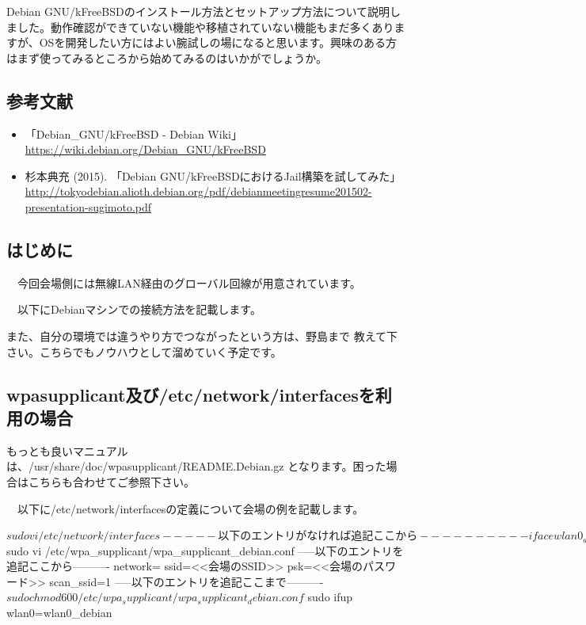 \documentclass[mingoth,a4paper]{jsarticle}
\begin{document}
Debian GNU/kFreeBSDのインストール方法とセットアップ方法について説明しました。動作確認ができていない機能や移植されていない機能もまだ多くありますが、OSを開発したい方にはよい腕試しの場になると思います。興味のある方はまず使ってみるところから始めてみるのはいかがでしょうか。

\subsection{参考文献}

\begin{itemize}
  \item 「Debian\_GNU/kFreeBSD - Debian Wiki」 \url{https://wiki.debian.org/Debian\_GNU/kFreeBSD}
  \item 杉本典充 (2015). 「Debian GNU/kFreeBSDにおけるJail構築を試してみた」 \url{http://tokyodebian.alioth.debian.org/pdf/debianmeetingresume201502-presentation-sugimoto.pdf}
\end{itemize}

 \subsection{はじめに}

　今回会場側には無線LAN経由のグローバル回線が用意されています。

　以下にDebianマシンでの接続方法を記載します。

 また、自分の環境では違うやり方でつながったという方は、野島まで
教えて下さい。こちらでもノウハウとして溜めていく予定です。

 \subsection{wpasupplicant及び/etc/network/interfacesを利用の場合}

 もっとも良いマニュアルは、/usr/share/doc/wpasupplicant/README.Debian.gz
となります。困った場合はこちらも合わせてご参照下さい。

　以下に/etc/network/interfacesの定義について会場の例を記載します。

\begin{commandline}
$ sudo vi /etc/network/interfaces
-----以下のエントリがなければ追記ここから----------
iface wlan0_debian inet dhcp
     wpa-conf /etc/wpa_supplicant/wpa_supplicant_debian.conf
-----以下のエントリがなければ追記ここまで----------
$ sudo vi /etc/wpa_supplicant/wpa_supplicant_debian.conf
-----以下のエントリを追記ここから----------
network={
     ssid=<<会場のSSID>>
     psk=<<会場のパスワード>>
     scan_ssid=1
}
-----以下のエントリを追記ここまで----------
$ sudo chmod 600 /etc/wpa_supplicant/wpa_supplicant_debian.conf
$ sudo ifup wlan0=wlan0_debian
\end{commandline}
\end{document}
